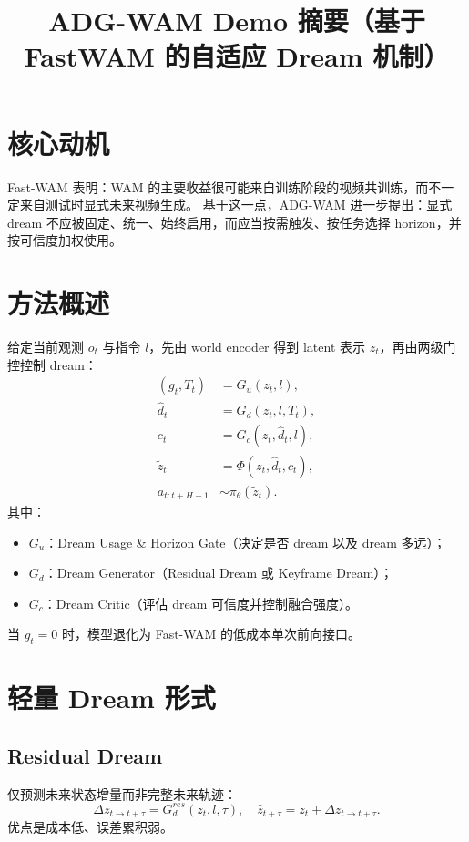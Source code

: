 \documentclass[11pt]{article}
\title{ADG-WAM Demo 摘要（基于 FastWAM 的自适应 Dream 机制）}
\author{}
\date{}
\begin{document}
\maketitle

\section{核心动机}
Fast-WAM 表明：WAM 的主要收益很可能来自训练阶段的视频共训练，而不一定来自测试时显式未来视频生成。
基于这一点，ADG-WAM 进一步提出：显式 dream 不应被固定、统一、始终启用，而应当按需触发、按任务选择 horizon，并按可信度加权使用。

\section{方法概述}
给定当前观测 $o_t$ 与指令 $l$，先由 world encoder 得到 latent 表示 $z_t$，再由两级门控控制 dream：
\begin{align}
(g_t, T_t) &= G_u(z_t, l), \\
\hat d_t &= G_d(z_t, l, T_t), \\
 c_t &= G_c(z_t, \hat d_t, l), \\
\tilde z_t &= \Phi(z_t, \hat d_t, c_t), \\
 a_{t:t+H-1} &\sim \pi_\theta(\tilde z_t).
\end{align}
其中：
\begin{itemize}
  \item $G_u$：Dream Usage \& Horizon Gate（决定是否 dream 以及 dream 多远）；
  \item $G_d$：Dream Generator（Residual Dream 或 Keyframe Dream）；
  \item $G_c$：Dream Critic（评估 dream 可信度并控制融合强度）。
\end{itemize}
当 $g_t=0$ 时，模型退化为 Fast-WAM 的低成本单次前向接口。

\section{轻量 Dream 形式}
\subsection{Residual Dream}
仅预测未来状态增量而非完整未来轨迹：
\begin{equation}
\Delta z_{t\rightarrow t+\tau} = G_d^{res}(z_t, l, \tau), \quad
\hat z_{t+\tau}=z_t+\Delta z_{t\rightarrow t+\tau}.
\end{equation}
优点是成本低、误差累积弱。
\end{document}
